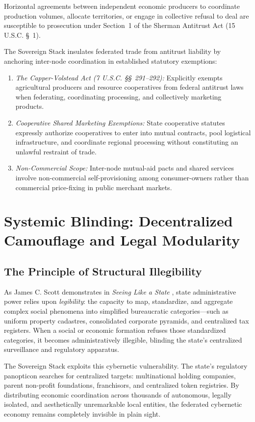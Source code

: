 Horizontal agreements between independent economic producers to coordinate production volumes, allocate territories, or engage in collective refusal to deal are susceptible to prosecution under Section~1 of the Sherman Antitrust Act (15 U.S.C. \S~1).

The Sovereign Stack insulates federated trade from antitrust liability by anchoring inter-node coordination in established statutory exemptions:
\begin{enumerate}
  \item \textit{The Capper-Volstead Act (7 U.S.C. \S\S~291--292):} Explicitly exempts agricultural producers and resource cooperatives from federal antitrust laws when federating, coordinating processing, and collectively marketing products.
  \item \textit{Cooperative Shared Marketing Exemptions:} State cooperative statutes expressly authorize cooperatives to enter into mutual contracts, pool logistical infrastructure, and coordinate regional processing without constituting an unlawful restraint of trade.
  \item \textit{Non-Commercial Scope:} Inter-node mutual-aid pacts and shared services involve non-commercial self-provisioning among consumer-owners rather than commercial price-fixing in public merchant markets.
\end{enumerate}

\section{Systemic Blinding: Decentralized Camouflage and Legal Modularity}
\label{sec:l7-blinding}

\subsection{The Principle of Structural Illegibility}

As James C. Scott demonstrates in \textit{Seeing Like a State} \parencite{scott1998}, state administrative power relies upon \textit{legibility}: the capacity to map, standardize, and aggregate complex social phenomena into simplified bureaucratic categories—such as uniform property cadastres, consolidated corporate pyramids, and centralized tax registers. When a social or economic formation refuses those standardized categories, it becomes administratively illegible, blinding the state's centralized surveillance and regulatory apparatus.

The Sovereign Stack exploits this cybernetic vulnerability. The state's regulatory panopticon searches for centralized targets: multinational holding companies, parent non-profit foundations, franchisors, and centralized token registries. By distributing economic coordination across thousands of autonomous, legally isolated, and aesthetically unremarkable local entities, the federated cybernetic economy remains completely invisible in plain sight.

